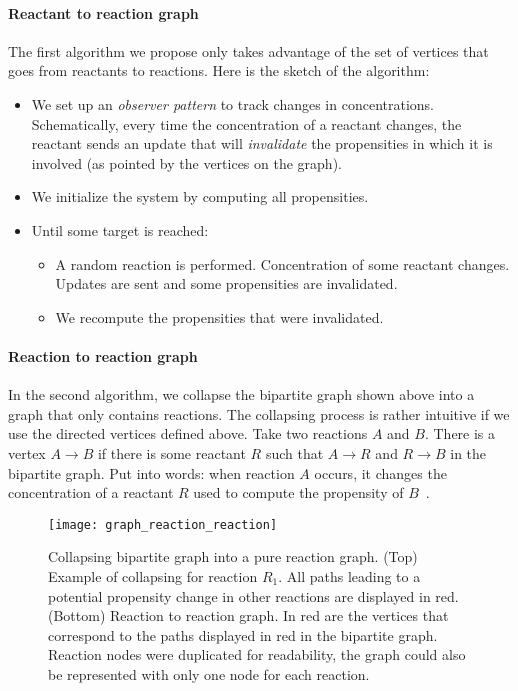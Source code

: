 \paragraph{Reactant to reaction graph}
The first algorithm we propose only takes advantage of the set of vertices that goes from reactants to reactions.
Here is the sketch of the algorithm:
\begin{itemize}
  \item We set up an \emph{observer pattern} to track changes in concentrations.
  Schematically, every time the concentration of a reactant changes,
  the reactant sends an update that will \emph{invalidate} the propensities in which it is involved
  (as pointed by the vertices on the graph).
  \item We initialize the system by computing all propensities.
  \item Until some target is reached:
    \begin{itemize}
      \item A random reaction is performed. Concentration of some reactant changes.
      Updates are sent and some propensities are invalidated.
      \item We recompute the propensities that were invalidated.
    \end{itemize}
\end{itemize}

\paragraph{Reaction to reaction graph}
In the second algorithm, we collapse the bipartite graph shown above into a graph that only contains reactions.
The collapsing process is rather intuitive if we use the directed vertices defined above.
Take two reactions $A$ and $B$.
There is a vertex $A \rightarrow B$ if there is some reactant $R$ such that $A \rightarrow R$ and $R \rightarrow B$ in the bipartite graph.
Put into words: when reaction $A$ occurs,
it changes the concentration of a reactant $R$ used to compute the propensity of $B$~.

\begin{figure}[!ht]
  \centering
  \texttt{[image: graph\_reaction\_reaction]}
  \caption{Collapsing bipartite graph into a pure reaction graph.
  (Top) Example of collapsing for reaction $R_1$.
  All paths leading to a potential propensity change in other reactions are displayed in red.
  (Bottom) Reaction to reaction graph.
  In red are the vertices that correspond to the paths displayed in red in the bipartite graph.
  Reaction nodes were duplicated for readability, the graph could also be represented with only one node for each reaction.}
\label{fig:reaction_reaction_graph}
\end{figure}

